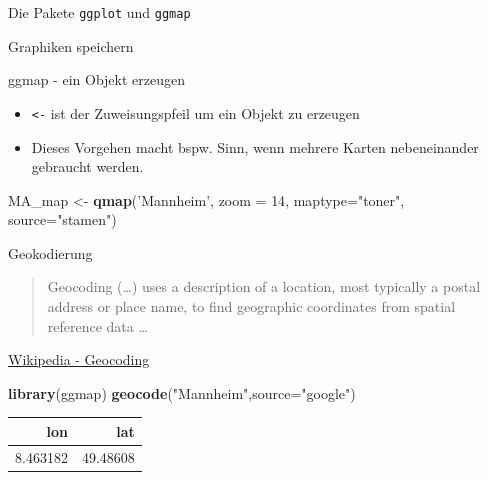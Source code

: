 \documentclass[ignorenonframetext,]{beamer}
\newenvironment{Shaded}{}{}
\newcommand{\KeywordTok}[1]{\textcolor[rgb]{0.00,0.44,0.13}{\textbf{{#1}}}}
\newcommand{\DataTypeTok}[1]{\textcolor[rgb]{0.56,0.13,0.00}{{#1}}}
\newcommand{\DecValTok}[1]{\textcolor[rgb]{0.25,0.63,0.44}{{#1}}}
\newcommand{\StringTok}[1]{\textcolor[rgb]{0.25,0.44,0.63}{{#1}}}
\newcommand{\NormalTok}[1]{{#1}}
\providecommand{\tightlist}{%
\setlength{\itemsep}{0pt}\setlength{\parskip}{0pt}}
\begin{document}
\begin{frame}[fragile]{Die Pakete \texttt{ggplot} und \texttt{ggmap}}
\begin{block}{Graphiken speichern}
\end{block}

\begin{block}{ggmap - ein Objekt erzeugen}

\begin{itemize}
\tightlist
\item
  \texttt{\textless{}-} ist der Zuweisungspfeil um ein Objekt zu
  erzeugen
\item
  Dieses Vorgehen macht bspw. Sinn, wenn mehrere Karten nebeneinander
  gebraucht werden.
\end{itemize}

\begin{Shaded}
\begin{Highlighting}[]
\NormalTok{MA_map <-}\StringTok{ }\KeywordTok{qmap}\NormalTok{(}\StringTok{'Mannheim'}\NormalTok{, }
               \DataTypeTok{zoom =} \DecValTok{14}\NormalTok{,}
               \DataTypeTok{maptype=}\StringTok{"toner"}\NormalTok{,}
               \DataTypeTok{source=}\StringTok{"stamen"}\NormalTok{)}
\end{Highlighting}
\end{Shaded}

\end{block}

\begin{block}{Geokodierung}

\begin{quote}
Geocoding (\ldots{}) uses a description of a location, most typically a
postal address or place name, to find geographic coordinates from
spatial reference data \ldots{}
\end{quote}

\href{https://github.com/adam-p/markdown-here/wiki/Markdown-Cheatsheet\#blockquotes}{Wikipedia
- Geocoding}

\begin{Shaded}
\begin{Highlighting}[]
\KeywordTok{library}\NormalTok{(ggmap)}
\KeywordTok{geocode}\NormalTok{(}\StringTok{"Mannheim"}\NormalTok{,}\DataTypeTok{source=}\StringTok{"google"}\NormalTok{)}
\end{Highlighting}
\end{Shaded}

\begin{longtable}[]{@{}rr@{}}
\toprule
lon & lat\tabularnewline
\midrule
\endhead
8.463182 & 49.48608\tabularnewline
\bottomrule
\end{longtable}

\end{block}


\end{frame}
\end{document}
